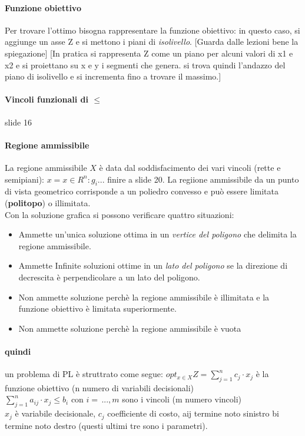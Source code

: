 \documentclass[12pt, a4paper, openany]{book}
\begin{document}
\paragraph*{Funzione obiettivo}
Per trovare l'ottimo bisogna rappresentare la funzione obiettivo:
in questo caso, si aggiunge un asse Z e si mettono i piani di \emph{isolivello}.
[Guarda dalle lezioni bene la spiegazione] [In pratica si rappresenta Z come un piano per alcuni valori di x1 e x2 e si proiettano su x e y i segmenti che genera.
si trova quindi l'andazzo del piano di isolivello e si incrementa fino a trovare il massimo.]
\paragraph*{Vincoli funzionali di $\leq$} slide 16
\paragraph*{Regione ammissibile} La regione ammissibile $X$ è data dal soddisfacimento dei vari vincoli (rette e semipiani):
$x= x\in {R}^n : g_i ...$ finire a slide 20.
La regiione ammissibile da un punto di vista geometrico corrisponde a un poliedro convesso e può essere limitata (\textbf{politopo}) o illimitata.
\\Con la soluzione grafica si possono verificare quattro situazioni:
\begin{itemize}
    \item Ammette un'unica soluzione ottima in un \emph{vertice del poligono} che delimita la regione ammissibile.
    \item Ammette Infinite soluzioni ottime in un \emph{lato del poligono} se la direzione di decrescita è perpendicolare a un lato del poligono.
    \item Non ammette soluzione perchè la regione ammissibile è illimitata e la funzione obiettivo è limitata superiormente.
    \item Non ammette soluzione perchè la regione ammissibile è vuota
\end{itemize}
\paragraph*{quindi} un problema di PL è struttrato come segue:
$opt_{x\in X} Z = \sum_{j=1}^{n} c_j\cdot x_j$ è la funzione obiettivo (n numero di variabili decisionali)
\\ $\sum_{j=1}^n a_{ij} \cdot x_j \leq b_i$ con $i=\,...,m$ sono i vincoli (m numero vincoli)
\\$x_j$ è variabile decisionale, $c_j$ coefficiente di costo, aij termine noto sinistro bi termine noto destro (questi ultimi tre sono i parametri).
\end{document}
